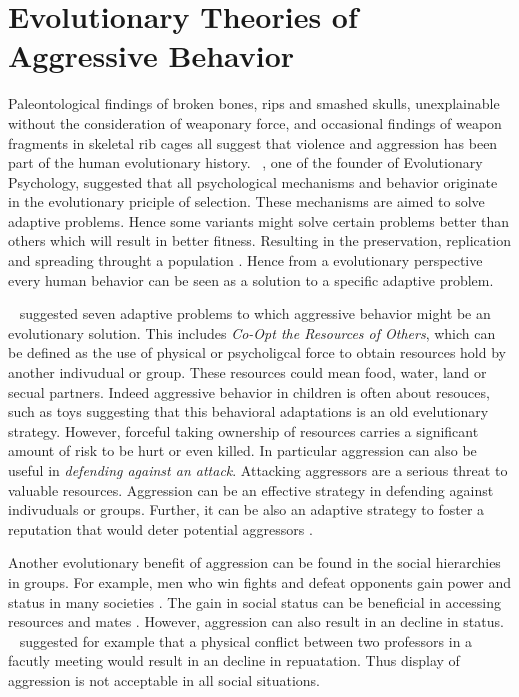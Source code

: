 \section{Evolutionary Theories of Aggressive Behavior}
\label{sec:evolutionary_theories_on_aggressive_behavior}

Paleontological findings of broken bones, rips and smashed skulls, unexplainable without the consideration of weaponary force, and occasional findings of weapon fragments in skeletal rib cages all suggest that violence and aggression has been part of the human evolutionary history. 
~\cite{Buss1997}, one of the founder of Evolutionary Psychology, suggested that all psychological mechanisms and behavior originate in the evolutionary priciple of selection.  
These mechanisms are aimed to solve adaptive problems.
Hence some variants might solve certain problems better than others which will result in better fitness.
Resulting in the preservation, replication and spreading throught a population \cite{Buss1997}.
Hence from a evolutionary perspective every human behavior can be seen as a solution to a specific adaptive problem.

~\cite{Buss1997} suggested seven adaptive problems to which aggressive behavior might be an evolutionary solution.
This includes \textit{Co-Opt the Resources of Others}, which can be defined as the use of physical or psycholigcal force to obtain resources hold by another indivudual or group.
These resources could mean food, water, land or secual partners.
Indeed aggressive behavior in children is often about resouces, such as toys \cite{Campbell1995} suggesting that this behavioral adaptations is an old evelutionary strategy.
However, forceful taking ownership of resources carries a significant amount of risk to be hurt or even killed.
In particular aggression can also be  useful in \textit{defending against an attack}.
Attacking aggressors are a serious threat to valuable resources.
Aggression can be an effective strategy in defending against indivuduals or groups.
Further, it can be also an adaptive strategy to foster a reputation that would deter potential aggressors \cite{Buss1997}.

Another evolutionary benefit of aggression can be found in the  social hierarchies in groups.
For example, men who win fights and defeat opponents gain power and status in many societies \cite{Hill1996}.
The gain in social status can be beneficial in accessing resources and mates \cite{Archer2009}.
However, aggression can also result in an decline in status.
~\cite{Buss1997} suggested for example that a physical conflict between two professors in a facutly meeting would result in an decline in repuatation.
Thus display of aggression is not acceptable in all social situations.

